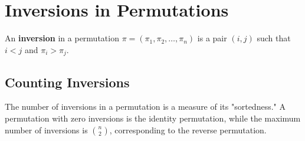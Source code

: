 \documentclass[12pt]{article}
\begin{document}
\section{Inversions in Permutations}

An \textbf{inversion} in a permutation \( \pi = (\pi_1, \pi_2, \ldots, \pi_n) \) is a pair \( (i, j) \) such that \( i < j \) and \( \pi_i > \pi_j \).

\subsection{Counting Inversions}

The number of inversions in a permutation is a measure of its "sortedness." A permutation with zero inversions is the identity permutation, while the maximum number of inversions is \( \binom{n}{2} \), corresponding to the reverse permutation.
\end{document}
